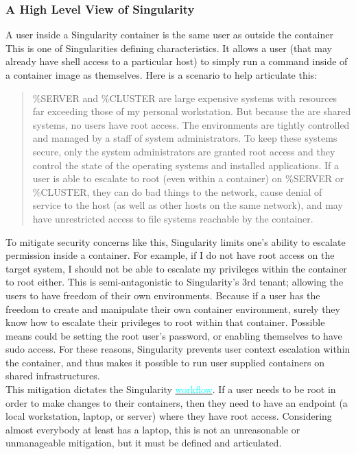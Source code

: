 \documentclass[a4paper]{article}
\newcounter{subsubsubsection}[subsubsection]
\begin{document}
\subsubsection{A High Level View of Singularity}
\label{sec:securityandpriviledge}
A user inside a Singularity container is the same user as outside the container
\\[0.2in]
This is one of Singularities defining characteristics. It allows a user (that may already have shell access to a particular host) to simply run a command inside of a container image as themselves. Here is a scenario to help articulate this:
\\
\begin{quote}
\%SERVER and \%CLUSTER are large expensive systems with resources far exceeding those of my personal workstation. But because the are shared systems, no users have root access. The environments are tightly controlled and managed by a staff of system administrators. To keep these systems secure, only the system administrators are granted root access and they control the state of the operating systems and installed applications. If a user is able to escalate to root (even within a container) on \%SERVER or \%CLUSTER, they can do bad things to the network, cause denial of service to the host (as well as other hosts on the same network), and may have unrestricted access to file systems reachable by the container.
\end{quote}
To mitigate security concerns like this, Singularity limits one’s ability to escalate permission inside a container. For example, if I do not have root access on the target system, I should not be able to escalate my privileges within the container to root either. This is semi-antagonistic to Singularity’s 3rd tenant; allowing the users to have freedom of their own environments. Because if a user has the freedom to create and manipulate their own container environment, surely they know how to escalate their privileges to root within that container. Possible means could be setting the root user’s password, or enabling themselves to have sudo access. For these reasons, Singularity prevents user context escalation within the container, and thus makes it possible to run user supplied containers on shared infrastructures.
\\[0.2in]
This mitigation dictates the Singularity \hyperref[sec:singularityflow]{{\textcolor{cyan}{workflow}}}. If a user needs to be root in order to make changes to their containers, then they need to have an endpoint (a local workstation, laptop, or server) where they have root access. Considering almost everybody at least has a laptop, this is not an unreasonable or unmanageable mitigation, but it must be defined and articulated.
\end{document}
